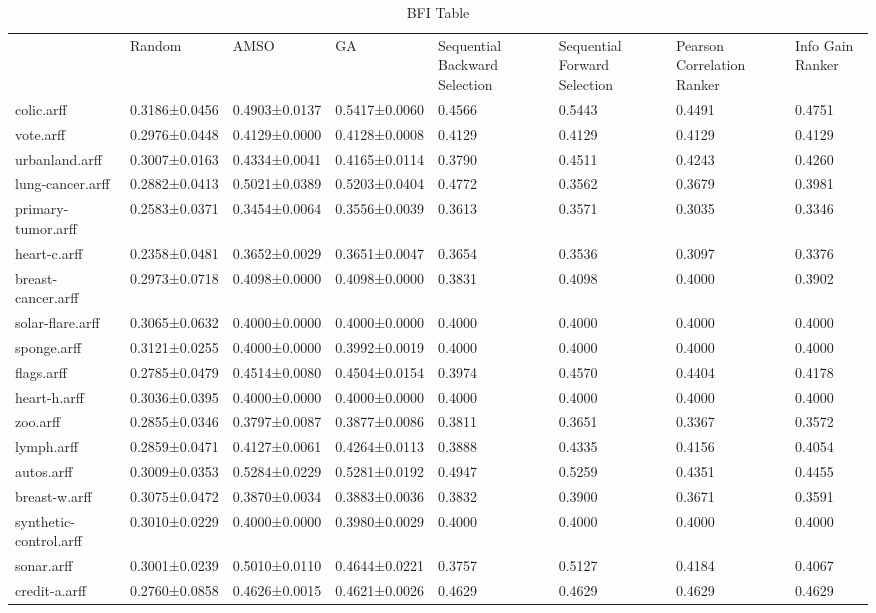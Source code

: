 \begin{table*}[h]
\caption{BFI Table}
\label{tbl:bfi}\begin{tabular}{llllllll}
\noalign{\smallskip}\hline\noalign{\smallskip}
&Random&AMSO&GA&Sequential Backward Selection&Sequential Forward Selection&Pearson Correlation Ranker&Info Gain Ranker\\\noalign{\smallskip}\hline
colic.arff&0.3186±0.0456&0.4903±0.0137&0.5417±0.0060&0.4566&0.5443&0.4491&0.4751\\
vote.arff&0.2976±0.0448&0.4129±0.0000&0.4128±0.0008&0.4129&0.4129&0.4129&0.4129\\
urbanland.arff&0.3007±0.0163&0.4334±0.0041&0.4165±0.0114&0.3790&0.4511&0.4243&0.4260\\
lung-cancer.arff&0.2882±0.0413&0.5021±0.0389&0.5203±0.0404&0.4772&0.3562&0.3679&0.3981\\
primary-tumor.arff&0.2583±0.0371&0.3454±0.0064&0.3556±0.0039&0.3613&0.3571&0.3035&0.3346\\
heart-c.arff&0.2358±0.0481&0.3652±0.0029&0.3651±0.0047&0.3654&0.3536&0.3097&0.3376\\
breast-cancer.arff&0.2973±0.0718&0.4098±0.0000&0.4098±0.0000&0.3831&0.4098&0.4000&0.3902\\
solar-flare.arff&0.3065±0.0632&0.4000±0.0000&0.4000±0.0000&0.4000&0.4000&0.4000&0.4000\\
sponge.arff&0.3121±0.0255&0.4000±0.0000&0.3992±0.0019&0.4000&0.4000&0.4000&0.4000\\
flags.arff&0.2785±0.0479&0.4514±0.0080&0.4504±0.0154&0.3974&0.4570&0.4404&0.4178\\
heart-h.arff&0.3036±0.0395&0.4000±0.0000&0.4000±0.0000&0.4000&0.4000&0.4000&0.4000\\
zoo.arff&0.2855±0.0346&0.3797±0.0087&0.3877±0.0086&0.3811&0.3651&0.3367&0.3572\\
lymph.arff&0.2859±0.0471&0.4127±0.0061&0.4264±0.0113&0.3888&0.4335&0.4156&0.4054\\
autos.arff&0.3009±0.0353&0.5284±0.0229&0.5281±0.0192&0.4947&0.5259&0.4351&0.4455\\
breast-w.arff&0.3075±0.0472&0.3870±0.0034&0.3883±0.0036&0.3832&0.3900&0.3671&0.3591\\
synthetic-control.arff&0.3010±0.0229&0.4000±0.0000&0.3980±0.0029&0.4000&0.4000&0.4000&0.4000\\
sonar.arff&0.3001±0.0239&0.5010±0.0110&0.4644±0.0221&0.3757&0.5127&0.4184&0.4067\\
credit-a.arff&0.2760±0.0858&0.4626±0.0015&0.4621±0.0026&0.4629&0.4629&0.4629&0.4629\\

\end{tabular}
\end{table*}
